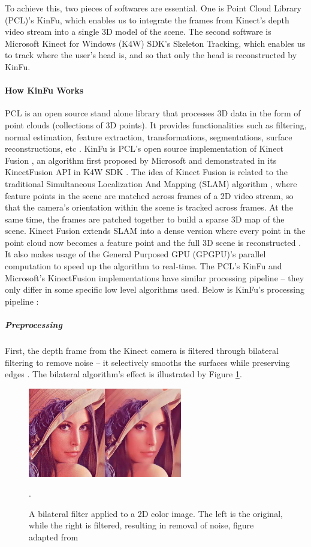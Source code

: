 To achieve this, two pieces of softwares are essential.  One is Point Cloud Library (PCL)'s KinFu, which enables us to integrate the frames from Kinect's depth video stream into a single 3D model of the scene.  The second software is Microsoft Kinect for Windows (K4W) SDK's Skeleton Tracking, which enables us to track where the user's head is, and so that only the head is reconstructed by KinFu.

\paragraph{How KinFu Works}
PCL is an open source stand alone library that processes 3D data in the form of point clouds (collections of 3D points).  It provides functionalities such as filtering, normal estimation, feature extraction, transformations, segmentations, surface reconstructions, etc \cite{rusu20113d}.  KinFu is PCL's open source implementation of Kinect Fusion \cite{pirovano2011kinfu}, an algorithm first proposed by Microsoft and demonstrated in its KinectFusion API in K4W SDK \cite{newcombe2011kinectfusion}.  The idea of Kinect Fusion is related to the traditional Simultaneous Localization And Mapping (SLAM) algorithm \cite{pirovano2011kinfu}, where feature points in the scene are matched across frames of a 2D video stream, so that the camera's orientation within the scene is tracked across frames.  At the same time, the frames are patched together to build a sparse 3D map of the scene.  Kinect Fusion extends SLAM into a dense version where every point in the point cloud now becomes a feature point and the full 3D scene is reconstructed \cite{newcombe2011kinectfusion}. It also makes usage of the General Purposed GPU (GPGPU)'s parallel computation to speed up the algorithm to real-time.  The PCL's KinFu and Microsoft's KinectFusion implementations have similar processing pipeline -- they only differ in some specific low level algorithms used.  Below is KinFu's processing pipeline \cite{newcombe2011kinectfusion}:

\subparagraph{Preprocessing}
First, the depth frame from the Kinect camera is filtered through bilateral filtering to remove noise -- it selectively smooths the surfaces while preserving edges \cite{tomasi1998bilateral}.  The bilateral algorithm's effect is illustrated by Figure \ref{fig:bilateralFiltering}.
\begin{figure} [h]
	\centering
	\includegraphics[width=0.6\textwidth]{./img/bilateral_filtering.jpg}
	\caption{A bilateral filter applied to a 2D color image.  The left is the original, while the right is filtered, resulting in removal of noise, figure adapted from \cite{pirovano2011kinfu}}.
	\label{fig:bilateralFiltering}
\end{figure}

